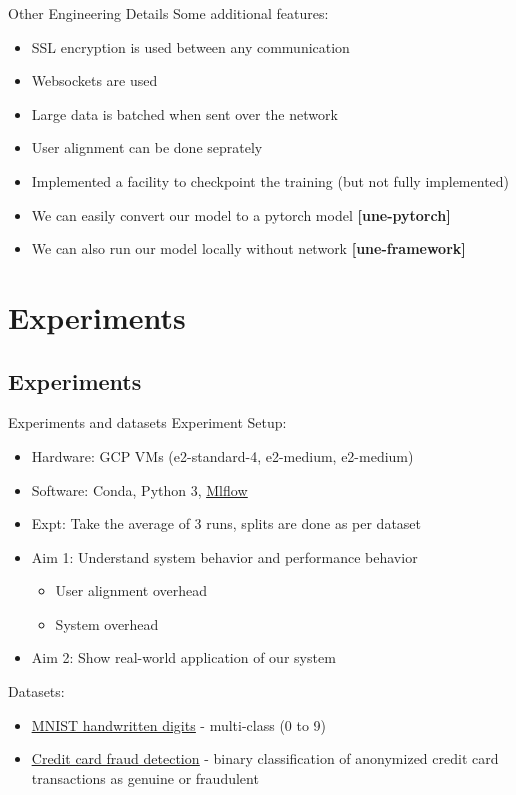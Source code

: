 \documentclass[xcolor=dvipsnames]{beamer}
\begin{document}
\begin{frame}{Other Engineering Details}
  Some additional features:
  \begin{itemize}
    \item SSL encryption is used between any communication
    \item Websockets are used
    \item Large data is batched when sent over the network
    \item User alignment can be done seprately
    \item Implemented a facility to checkpoint the training (but not fully implemented)
    \item We can easily convert our model to a pytorch model \textbf{[une-pytorch]}
    \item We can also run our model locally without network \textbf{[une-framework]}
  \end{itemize}
\end{frame}

\section{Experiments}

\subsection{Experiments}
\begin{frame}{Experiments and datasets}
    Experiment Setup: 
    \begin{itemize}
        \item Hardware: GCP VMs (e2-standard-4, e2-medium, e2-medium)
        \item Software: Conda, Python 3, \href{http://34.67.88.74:5000/mlflow/}{\underline{Mlflow}}
        \item Expt: Take the average of 3 runs, splits are done as per dataset
        \item Aim 1: Understand system behavior and performance behavior
        \begin{itemize}
            \item User alignment overhead
            \item System overhead
        \end{itemize}
        \item Aim 2: Show real-world application of our system
    \end{itemize}
    Datasets:
    \begin{itemize}
        \item \href{http://yann.lecun.com/exdb/mnist/}{\underline{MNIST handwritten digits}} - multi-class (0 to 9) 
        \item \href{https://www.kaggle.com/mlg-ulb/creditcardfraud}{\underline{Credit card fraud detection}} - binary classification of anonymized credit card transactions as genuine or fraudulent
    \end{itemize}
\end{frame}
\end{document}
